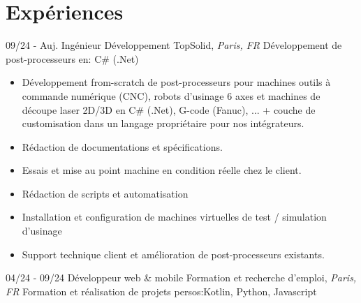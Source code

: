 \documentclass[]{friggeri-cv}
\begin{document}
\section{Expériences}
\vspace*{-0.25cm}

\begin{entrylist}
  \entry
    {09/24 - Auj.}
    {Ingénieur Développement}
    {TopSolid, \textit{Paris, FR}}
    {Développement de post-processeurs en:  C\# (.Net)}
\end{entrylist}
\vspace{-15pt}

\vspace{0.5mm}
\begin{itemize}
\setlength{\itemsep}{1pt}
\setlength{\parskip}{0pt}
\setlength{\parsep}{0pt}

\item Développement from-scratch de post-processeurs pour machines outils à commande numérique (CNC), robots d'usinage 6 axes et machines de découpe laser 2D/3D en C\# (.Net), G-code (Fanuc), ... + couche de customisation dans un langage propriétaire pour nos intégrateurs.
\item Rédaction de documentations et spécifications.
\item Essais et mise au point machine en condition réelle chez le client.
\item Rédaction de scripts et automatisation
\item Installation et configuration de machines virtuelles de test / simulation d'usinage
\item Support technique client et amélioration de post-processeurs existants.
\end{itemize}

\begin{entrylist}
  \entry
    {04/24 - 09/24}
    {Développeur web \& mobile}
    {Formation et recherche d'emploi, \textit{Paris, FR}}
    {Formation et réalisation de projets persos:\hspace*{8mm}Kotlin, Python, Javascript}
\end{entrylist}
\vspace{-15pt}
\end{document}
